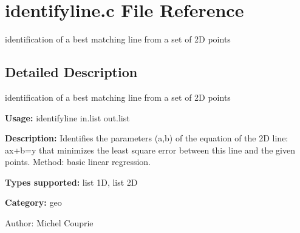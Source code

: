 \section{identifyline.c File Reference}
\label{identifyline_8c}
identification of a best matching line from a set of 2D points 



\subsection{Detailed Description}
identification of a best matching line from a set of 2D points 

{\bf Usage:} identifyline in.list out.list

{\bf Description:} Identifies the parameters (a,b) of the equation of the 2D line: ax+b=y that minimizes the least square error between this line and the given points. Method: basic linear regression.

{\bf Types supported:} list 1D, list 2D

{\bf Category:} geo

\begin{Desc}
\item[Author:]Michel Couprie \end{Desc}
